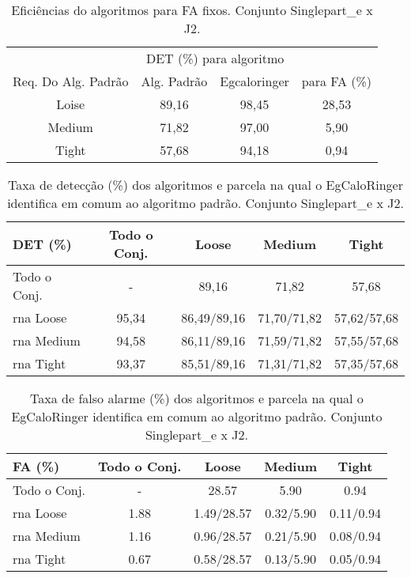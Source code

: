 \begin{table}[htb]
\centering
\begin{tabular}{cccc}
\hline
\hline
 & 
\multicolumn{2}{c}{DET (\%) para algoritmo} & 
\\
\cline{2-3}
\multirow{-2}{*}{Req. Do Alg. Padrão} & 
Alg. Padrão & 
Egcaloringer & 
\multirow{-2}{*}{para FA (\%)} \\
\hline
Loise & 89,16 & 98,45 & 28,53 \\
Medium & 71,82 & 97,00 & 5,90 \\
Tight & 57,68 & 94,18 & 0,94 \\
\hline
\hline
\end{tabular}
\caption{Eficiências do algoritmos para FA fixos. Conjunto Singlepart\_e x J2.}
\label{tab:singlexj2_efic}
\end{table}

\begin{table}[htb]
\centering
\begin{tabular}{l cccc}
\hline
\hline
DET (\%)& Todo o Conj. & Loose & Medium & Tight \\
\hline
Todo o Conj. &  - & 89,16 & 71,82 & 57,68 \\
\hline
\gls{rna} Loose & 95,34 & 86,49/89,16 & 71,70/71,82 & 57,62/57,68 \\
\hline
\gls{rna} Medium & 94,58  & 86,11/89,16 & 71,59/71,82 & 57,55/57,68 \\
\hline
\gls{rna} Tight &  93,37 & 85,51/89,16 &  71,31/71,82 & 57,35/57,68 \\
\hline
\hline
\end{tabular}
\caption{Taxa de detecção (\%) dos algoritmos e parcela na qual o EgCaloRinger
identifica em comum ao algoritmo padrão. Conjunto Singlepart\_e x J2.}
\label{tab:singlexj2_efic_det}
\end{table}

\begin{table}[htb]
\centering
\begin{tabular}{l cccc}
\hline
\hline
FA (\%)& Todo o Conj. & Loose & Medium & Tight \\
\hline
Todo o Conj. & - & 28.57 & 5.90 &  0.94 \\
\gls{rna} Loose  & 1.88  & 1.49/28.57 & 0.32/5.90 & 0.11/0.94 \\
\gls{rna} Medium & 1.16  & 0.96/28.57 & 0.21/5.90 & 0.08/0.94 \\
\gls{rna} Tight  & 0.67  & 0.58/28.57 & 0.13/5.90 & 0.05/0.94 \\
\hline
\hline
\end{tabular}
\caption{Taxa de falso alarme (\%) dos algoritmos e parcela na qual o EgCaloRinger
identifica em comum ao algoritmo padrão. Conjunto Singlepart\_e x J2.}
\label{tab:singlexj2_fa_det}
\end{table}

